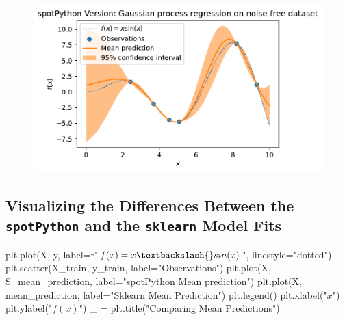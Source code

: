 \documentclass[
  letterpaper,
  DIV=11,
  numbers=noendperiod]{scrreprt}
\newenvironment{Shaded}{\begin{snugshade}}{\end{snugshade}}
\newcommand{\NormalTok}[1]{\textcolor[rgb]{0.00,0.23,0.31}{#1}}
\newcommand{\OperatorTok}[1]{\textcolor[rgb]{0.37,0.37,0.37}{#1}}
\newcommand{\StringTok}[1]{\textcolor[rgb]{0.13,0.47,0.30}{#1}}
\newcommand{\VerbatimStringTok}[1]{\textcolor[rgb]{0.13,0.47,0.30}{#1}}
\begin{document}
\begin{figure}[H]

{\centering \includegraphics{011_num_spot_sklearn_gaussian_files/figure-pdf/cell-7-output-1.pdf}

}

\end{figure}

\hypertarget{visualizing-the-differences-between-the-spotpython-and-the-sklearn-model-fits}{%
\subsection{\texorpdfstring{Visualizing the Differences Between the
\texttt{spotPython} and the \texttt{sklearn} Model
Fits}{Visualizing the Differences Between the spotPython and the sklearn Model Fits}}\label{visualizing-the-differences-between-the-spotpython-and-the-sklearn-model-fits}}

\begin{Shaded}
\begin{Highlighting}[]
\NormalTok{plt.plot(X, y, label}\OperatorTok{=}\VerbatimStringTok{r"$f(x) = x \textbackslash{}sin(x)$"}\NormalTok{, linestyle}\OperatorTok{=}\StringTok{"dotted"}\NormalTok{)}
\NormalTok{plt.scatter(X\_train, y\_train, label}\OperatorTok{=}\StringTok{"Observations"}\NormalTok{)}
\NormalTok{plt.plot(X, S\_mean\_prediction, label}\OperatorTok{=}\StringTok{"spotPython Mean prediction"}\NormalTok{)}
\NormalTok{plt.plot(X, mean\_prediction, label}\OperatorTok{=}\StringTok{"Sklearn Mean Prediction"}\NormalTok{)}
\NormalTok{plt.legend()}
\NormalTok{plt.xlabel(}\StringTok{"$x$"}\NormalTok{)}
\NormalTok{plt.ylabel(}\StringTok{"$f(x)$"}\NormalTok{)}
\NormalTok{\_ }\OperatorTok{=}\NormalTok{ plt.title(}\StringTok{"Comparing Mean Predictions"}\NormalTok{)}
\end{Highlighting}
\end{Shaded}
\end{document}
